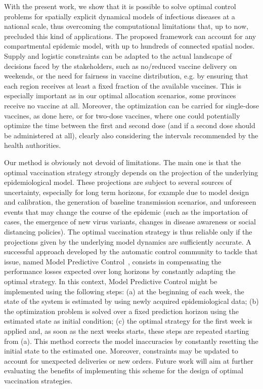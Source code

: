 With the present work, we show that it is possible to solve optimal control problems for spatially explicit dynamical models of infectious diseases at a national scale, thus overcoming the computational limitations that, up to now, precluded this kind of applications. The proposed framework can account for any compartmental epidemic model, with up to hundreds of connected spatial nodes. Supply and logistic constraints can be adapted to the actual landscape of decisions faced by the stakeholders, such as no/reduced vaccine delivery on weekends, or the need for fairness in vaccine distribution, e.g. by ensuring that each region receives at least a fixed fraction of the available vaccines. This is especially important as in our optimal allocation scenarios, some provinces receive no vaccine at all. Moreover, the optimization can be carried for single-dose vaccines, as done here, or for two-dose vaccines, where one could potentially optimize the time between the first and second dose (and if a second dose should be administered at all), clearly also considering the intervals recommended by the health authorities.

Our method is obviously not devoid of limitations. The main one is that the optimal vaccination strategy strongly depends on the projection of the underlying epidemiological model. These projections are subject to several sources of uncertainty, especially for long term horizons, for example due to model design and calibration\cite{Cramer:EvaluationIndividualEnsemble:2021}, the generation of baseline transmission scenarios, and unforeseen events that may change the course of the epidemic (such as the importation of cases, the emergence of new virus variants, changes in disease awareness or social distancing policies). The optimal vaccination strategy is thus reliable only if the projections given by the underlying model dynamics are sufficiently accurate. A successful approach developed by the automatic control community to tackle that issue, named Model Predictive Control~\cite{Rawlings:ModelPredictiveControl:2017}, consists in compensating the performance losses expected over long horizons by constantly adapting the optimal strategy. In this context, Model Predictive Control might be implemented using the following steps: (a) at the beginning of each week, the state of the system is estimated by using newly acquired epidemiological data; (b) the optimization problem is solved over a fixed prediction horizon using the estimated state as initial condition; (c) the optimal strategy for the first week is applied and, as soon as the next weeks starts, these steps are repeated starting from (a). This method corrects the model inaccuracies by constantly resetting the initial state to the estimated one. Moreover, constraints may be updated to account for unexpected deliveries or new orders. Future work will aim at further evaluating the benefits of implementing this scheme for the design of optimal vaccination strategies.


